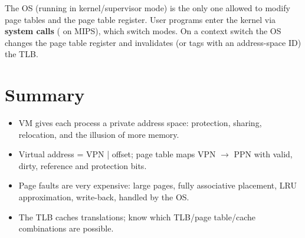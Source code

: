 The OS (running in kernel/supervisor mode) is the only one allowed to modify
page tables and the page table register. User programs enter the kernel via
\textbf{system calls} ( on MIPS), which switch modes. On a
context switch the OS changes the page table register and invalidates (or
tags with an address-space ID) the TLB.

\section*{Summary}
\begin{itemize}
  \item VM gives each process a private address space: protection, sharing,
    relocation, and the illusion of more memory.
  \item Virtual address = VPN | offset; page table maps VPN $\to$ PPN with
    valid, dirty, reference and protection bits.
  \item Page faults are very expensive: large pages, fully associative
    placement, LRU approximation, write-back, handled by the OS.
  \item The TLB caches translations; know which TLB/page table/cache
    combinations are possible.
\end{itemize}

